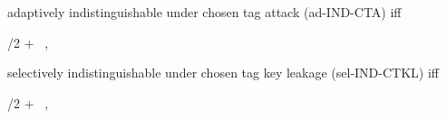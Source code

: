 \begin{definition}
\begin{sitemize}
        \item adaptively indistinguishable under chosen tag attack (ad-IND-CTA) iff
        \begin{bralign}
            /2 + \negl\parr{\secpar}
            \ ,
        \end{bralign}

        \item selectively indistinguishable under chosen tag key leakage (sel-IND-CTKL) iff
        \begin{bralign}
            /2 + \negl\parr{\secpar}
            \ ,
        \end{bralign}


\end{sitemize}
\end{definition}
